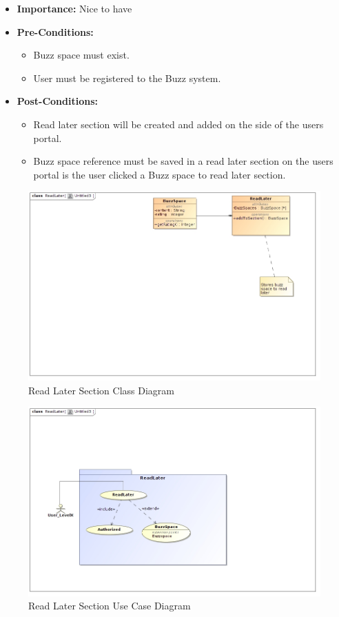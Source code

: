 \documentclass[11pt]{article}
\begin{document}
\begin{enumerate}
\begin{itemize}
\item \textbf{Importance:}  Nice to have
\item\textbf{Pre-Conditions: }
	\begin{itemize}
	\item Buzz space must exist.
	\item User must be registered to the Buzz system.

	\end{itemize}

\item\textbf{Post-Conditions: }
	\begin{itemize}
	\item Read later section will be created and added on the side of the
users portal.
	\item Buzz space reference must be saved in a read later section on the
users portal is the user clicked a Buzz space to read later section.
	
	\end{itemize}
\end{itemize}

\begin{figure}[H]	
\graphicspath{ {../Diagrams/sfiso/} }
    	\includegraphics[scale=0.5]{readC.jpg}
    	\caption{Read Later Section Class Diagram}
	\end{figure}

\begin{figure}[H]	
\graphicspath{ {../Diagrams/sfiso/} }
    	\includegraphics[scale=0.5]{read.jpg}
    	\caption{Read Later Section Use Case Diagram}
	\end{figure}
	

\end{enumerate}
\end{document}
